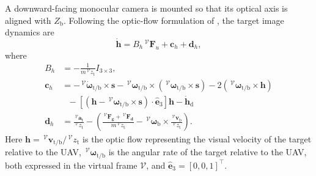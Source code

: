 A downward-facing monocular camera is mounted so that its optical axis is aligned with $Z_\text{b}$. Following the optic-flow formulation of \cite{herisse2012}, the target image dynamics are
\begin{equation}
    \dot{\boldsymbol{h}} = B_h \,^\mathcal{V} \boldsymbol{F}_u + \boldsymbol{c}_h + \boldsymbol{d}_h,
\end{equation}
where 
\begin{align*}
    B_h &= - \frac{1}{m \,^\mathcal{V} z_{\text{t}}} I_{3 \times 3}, \\
    \boldsymbol{c}_h &=  - \,^\mathcal{V}\dot{\boldsymbol{\omega}}_{\text{t/b}} \times \boldsymbol{s} - \,^\mathcal{V}\boldsymbol{\omega}_{\text{t/b}} \times \left(\,^\mathcal{V} \boldsymbol{\omega}_{\text{t/b}} \times \boldsymbol{s} \right) - 2 \left(\,^\mathcal{V} \boldsymbol{\omega}_{\text{t/b}} \times \boldsymbol{h} \right) \nonumber \\
    &~~~ - \left[\left( \boldsymbol{h} - \,^\mathcal{V}\boldsymbol{\omega}_{\text{t/b}} \times \boldsymbol{s} \right) \cdot \hat{\boldsymbol{e}}_3 \right] \boldsymbol{h} - \dot{\boldsymbol{h}}_\text{d} \\
    \boldsymbol{d}_h &= \frac{\,^\mathcal{V}\boldsymbol{a}_{\text{t}}}{\,^\mathcal{V}z_{\text{t}}} - \left(\frac{\,^\mathcal{V}\boldsymbol{F_{\text{g}}} + \,^\mathcal{V}\boldsymbol{F_{\text{d}}}}{m \,^\mathcal{V}z_{\text{t}}} - \,^\mathcal{V}\boldsymbol{\omega}_{\text{b}} \times \frac{\,^\mathcal{V}\boldsymbol{v}_{\text{b}}}{\,^\mathcal{V}z_{\text{t}}} \right).
\end{align*}
Here $\boldsymbol{h} = \,^\mathcal{V} \boldsymbol{v}_{\text{t/b}}/\,^\mathcal{V} z_{\text{t}}$ is the optic flow representing the visual velocity of the target relative to the UAV, $\,^\mathcal{V} \boldsymbol{\omega}_{\text{t/b}}$ is the angular rate of the target relative to the UAV, both expressed in the virtual frame $\mathcal{V}$, and $\hat{\boldsymbol{e}}_3=[0,0,1]^\top$.
 

